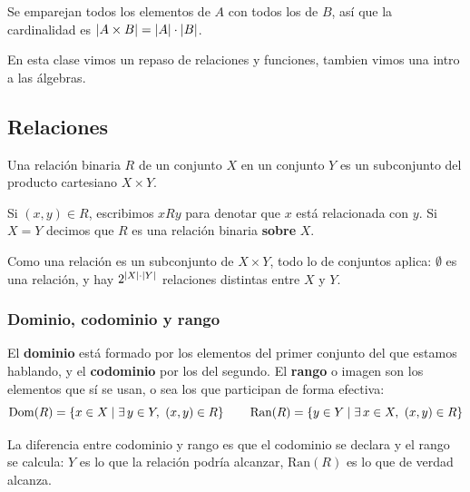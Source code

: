 \documentclass[11pt,letterpaper]{article}
\begin{document}
Se emparejan todos los elementos de $A$ con todos los de $B$, así que
la cardinalidad es $\left\lvert A \times B \right\rvert = \left\lvert A \right\rvert \cdot \left\lvert B \right\rvert$.

\newpage



\begin{quick_sum}
    En esta clase vimos un repaso de relaciones y funciones, tambien vimos
    una intro a las álgebras.
\end{quick_sum}

\subsection*{Relaciones}

\begin{definicion}
    Una relación binaria $R$ de un conjunto $X$ en un conjunto $Y$ es
    un subconjunto del producto cartesiano $X \times Y$.
\end{definicion}

Si $(x, y) \in R$, escribimos $xRy$ para denotar que $x$ está
relacionada con $y$. Si $X = Y$ decimos que $R$ es una relación
binaria \textbf{sobre} $X$.

Como una relación es un subconjunto de $X \times Y$, todo lo de
conjuntos aplica: $\emptyset$ es una relación, y hay
$2^{\left\lvert X \right\rvert \cdot \left\lvert Y \right\rvert}$ relaciones distintas entre $X$ y $Y$.

\subsubsection*{Dominio, codominio y rango}

El \textbf{dominio} está formado por los elementos del primer conjunto
del que estamos hablando, y el \textbf{codominio} por los del segundo.
El \textbf{rango} o imagen son los elementos que sí se usan, o sea los
que participan de forma efectiva:
\[
    \mathrm{Dom}(R) = \left\{ x \in X \mid \exists\, y \in Y,\ (x,y) \in R \right\}
    \qquad
    \mathrm{Ran}(R) = \left\{ y \in Y \mid \exists\, x \in X,\ (x,y) \in R \right\}
\]

La diferencia entre codominio y rango es que el codominio se declara y
el rango se calcula: $Y$ es lo que la relación podría alcanzar,
$\mathrm{Ran}(R)$ es lo que de verdad alcanza.
\end{document}
